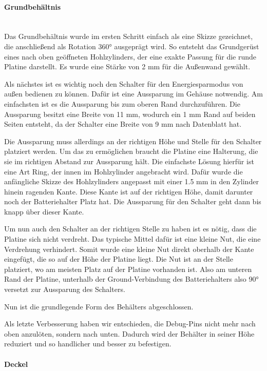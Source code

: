 \documentclass[a4paper,
DIV=13,
12pt,
BCOR=10mm,
department=FakEI,
parskip=half,
automark,
]{article}
\begin{document}
\paragraph{Grundbehältnis} $~$ \\
Das Grundbehältnis wurde im ersten Schritt einfach als eine Skizze gezeichnet, die anschließend als Rotation 360° ausgeprägt wird. So entsteht das Grundgerüst eines nach oben geöffneten Hohlzylinders, der eine exakte Passung für die runde Platine darstellt. Es wurde eine Stärke von 2 mm für die Außenwand gewählt. 

Als nächstes ist es wichtig noch den Schalter für den Energiesparmodus von außen bedienen zu können. Dafür ist eine Aussparung im Gehäuse notwendig. Am einfachsten ist es die Aussparung bis zum oberen Rand durchzuführen. Die Aussparung besitzt eine Breite von 11 mm, wodurch ein 1 mm Rand auf beiden Seiten entsteht, da der Schalter eine Breite von 9 mm nach Datenblatt hat. 

Die Aussparung muss allerdings an der richtigen Höhe und Stelle für den Schalter platziert werden. Um das zu ermöglichen braucht die Platine eine Halterung, die sie im richtigen Abstand zur Aussparung hält. Die einfachste Lösung hierfür ist eine Art Ring, der innen im Hohlzylinder angebracht wird. Dafür wurde die anfängliche Skizze des Hohlzylinders angepasst mit einer 1.5 mm in den Zylinder hinein ragenden Kante. Diese Kante ist auf der richtigen Höhe, damit darunter noch der Batteriehalter Platz hat. Die Aussparung für den Schalter geht dann bis knapp über dieser Kante.

Um nun auch den Schalter an der richtigen Stelle zu haben ist es nötig, dass die Platine sich nicht verdreht. Das typische Mittel dafür ist eine kleine Nut, die eine Verdrehung verhindert. Somit wurde eine kleine Nut direkt oberhalb der Kante eingefügt, die so auf der Höhe der Platine liegt. Die Nut ist an der Stelle platziert, wo am meisten Platz auf der Platine vorhanden ist. Also am unteren Rand der Platine, unterhalb der Ground-Verbindung des Batteriehalters also 90° versetzt zur Aussparung des Schalters. 

Nun ist die grundlegende Form des Behälters abgeschlossen. 

Als letzte Verbesserung haben wir entschieden, die Debug-Pins nicht mehr nach oben anzulöten, sondern nach unten. Dadurch wird der Behälter in seiner Höhe reduziert und so handlicher und besser zu befestigen. 

\paragraph{Deckel} $~$ \\
\end{document}
